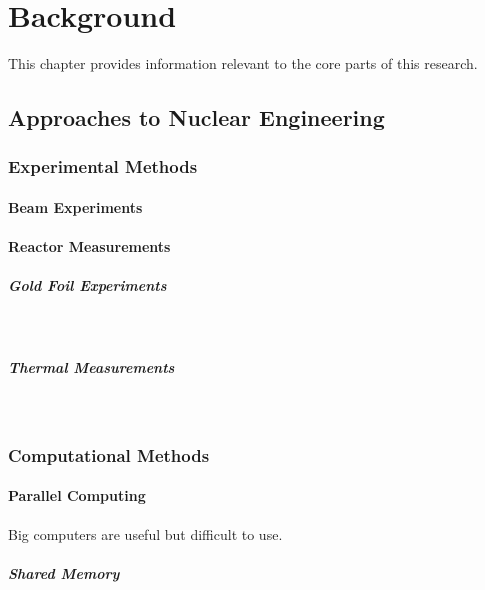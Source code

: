 \chapter{Background}

This chapter provides information relevant to the core parts of this research.

\section{Approaches to Nuclear Engineering}

\subsection{Experimental Methods}

\subsubsection{Beam Experiments}

\subsubsection{Reactor Measurements}

\paragraph{Gold Foil Experiments}\mbox{} \\

\paragraph{Thermal Measurements}\mbox{} \\

\subsection{Computational Methods}

\subsubsection{Parallel Computing}

Big computers are useful but difficult to use.

\paragraph{Shared Memory}\mbox{} \\

